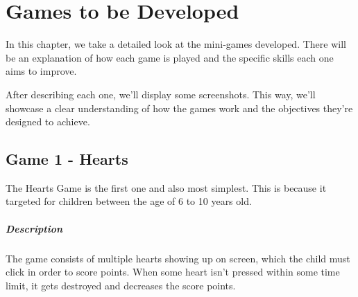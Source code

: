 \chapter{Games to be Developed}
\label{cha:games_to_be_developed}


In this chapter, we take a detailed look at the mini-games developed. There will be an explanation of how each game is played and the specific skills each one aims to improve.

After describing each one, we'll display some screenshots. This way, we'll showcase a clear understanding of how the games work and the objectives they’re designed to achieve.



\newpage
\section{Game 1 - Hearts}

The Hearts Game is the first one and also most simplest. This is because it targeted for children between the age of 6 to 10 years old.

\paragraph{Description}
The game consists of multiple hearts showing up on screen, which the child must click in order to score points. When some heart isn't pressed within some time limit, it gets destroyed and decreases the score points.

